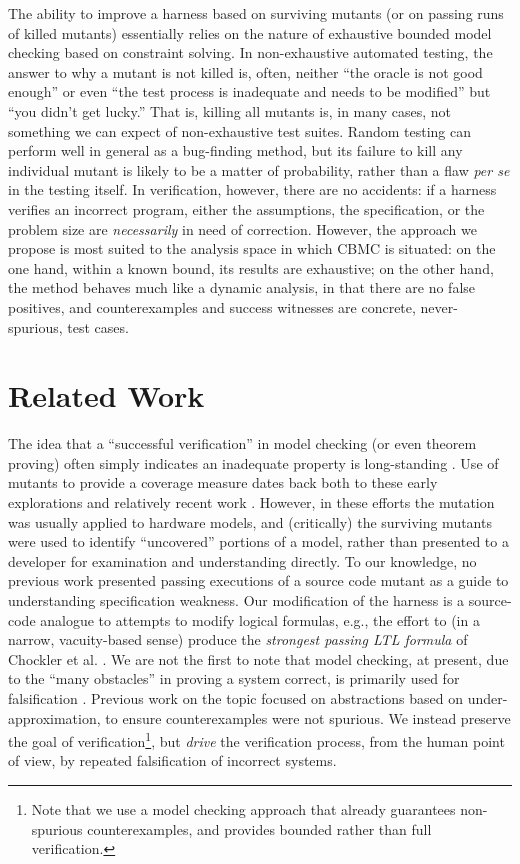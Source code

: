 \documentclass[conference]{IEEEtran}
\begin{document}
The ability to improve a harness based on surviving mutants (or on
passing runs of killed mutants) essentially relies on the nature of
exhaustive bounded model checking based on constraint solving.  In
non-exhaustive automated testing, the answer to why a mutant is not
killed is, often, neither ``the oracle is not good enough'' or even
``the test process is inadequate and needs to be modified'' but ``you
didn't get lucky.''  That is, killing all mutants is, in many cases,
not something we can expect of non-exhaustive test suites.  Random
testing \cite{HamletOnly,ICSEDiff} can perform well in general as a
bug-finding method, but its failure to kill any individual mutant is
likely to be a matter of probability, rather than a flaw \emph{per se}
in the testing itself.  In verification, however, there are no
accidents: if a harness verifies an incorrect program, either the
assumptions, the specification, or the problem size are \emph{necessarily} in
need of correction.  However, the approach we propose is most suited
to the analysis space in which CBMC is situated: on the one hand,
within a known bound, its results are exhaustive; on the other hand,
the method behaves much like a dynamic analysis, in that there are no
false positives, and counterexamples and success witnesses are concrete,
never-spurious, test cases.

\section{Related Work}

The idea that a ``successful verification'' in model checking (or even
theorem proving) often simply indicates an inadequate property is
long-standing \cite{PracticalCov,Hoskote}. Use of mutants
\cite{MutSpec,MutCov} to provide a coverage measure dates back both to
these early explorations and relatively recent work \cite{MutInterp}.
However, in these efforts the mutation was usually applied to hardware
models, and (critically) the surviving mutants were used to identify
``uncovered'' portions of a model, rather than presented to a
developer for examination and understanding directly.  To our
knowledge, no previous work presented passing executions of a source
code mutant as a guide to understanding specification weakness.  Our
modification of the harness is a source-code analogue to attempts to
modify logical formulas, e.g., the effort to (in a narrow,
vacuity-based sense) produce the \emph{strongest passing LTL formula}
of Chockler et al. \cite{BeyondVac}.  We are not the first to note
that model checking, at present, due to the ``many obstacles'' in
proving a system correct, is primarily used for falsification
\cite{AbsFals}.  Previous work on the topic \cite{AbsFals} focused on
abstractions based on under-approximation, to ensure counterexamples
were not spurious. We instead preserve the goal of
verification\footnote{Note that we use a model checking approach that
  already guarantees non-spurious counterexamples, and provides
  bounded rather than full verification.}, but \emph{drive} the verification
process, from the human point of view, by repeated falsification of
incorrect systems.
\end{document}

